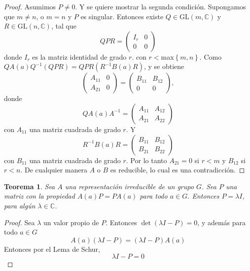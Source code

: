 \documentclass[12pt]{book}
\newtheorem{theorem}{Teorema}[section]
\theoremstyle{definition}
\newcounter{in}
\begin{document}
\begin{proof}
  Asumimos $P \neq 0$. Y se quiere mostrar la segunda
  condición. Supongamos que $m \neq n$, o $m=n$ y $P$ es
  singular. Entonces existe $Q \in \mathrm{GL}(m,\mathbb{C})$ y
  $R \in \mathrm{GL}(n,\mathbb{C})$, tal que
  \begin{equation}
    \label{eq:16}
    QPR=
    \begin{pmatrix}
      I_{r} & 0 \\ 
      0 & 0
    \end{pmatrix} 
  \end{equation}
  donde $I_{r}$ es la matriz identidad de grado $r$. con
  $r<$max$\left\{ m,n \right\}$. Como
  $QA(a)Q^{-1}(QPR) = QPR(R^{-1}B(a)R)$, y se obtiene
  \begin{equation}
    \label{eq:17}
    \begin{pmatrix}
      A_{11} & 0 \\ 
      A_{21} & 0
    \end{pmatrix}
    =
    \begin{pmatrix}
      B_{11} & B_{12} \\ 
      0 & 0
    \end{pmatrix},
  \end{equation}
  donde
  \begin{equation}
    \label{eq:18}
    QA(a)A^{-1}=
    \begin{pmatrix}
      A_{11} & A_{12} \\ 
      A_{21} & A_{22}
    \end{pmatrix} 
  \end{equation}  
  con $A_{11}$ una matriz cuadrada de grado $r$. Y
  \begin{equation}
    \label{eq:19}
    R^{-1}B(a)R=
    \begin{pmatrix}
      B_{11} & B_{12} \\ 
      B_{21} & B_{22}
    \end{pmatrix}
  \end{equation}
  con $B_{11}$ una matriz cuadrada de grado $r$. Por lo tanto
  $A_{21}=0$ si $r<m$ y $B_{12}$ si $r<n$. De cualquier manera
  $A$ o $B$ es reducible, lo cual es una
  contradicción.
\end{proof}

\begin{theorem}
  \label{t3_2}
  Sea $A$ una representación irreducible de un
  grupo $G$. Sea $P$ una matriz con la propiedad $A(a)P=PA(a)$ para todo
  $a \in G$. Entonces $P=\lambda I$, para algún
  $\lambda \in \mathbb{C}$.
\end{theorem}
\begin{proof}
  Sea $\lambda$ un valor propio de $P$. Entonces
  $\det(\lambda I - P)=0$, y además para todo $a \in G$
  \begin{equation}
    \label{eq:20}
    A(a)(\lambda I - P)=(\lambda I - P)A(a)
  \end{equation}
  Entonces por el Lema de Schur,
  \begin{equation}
    \label{eq:21}
    \lambda I-P=0
  \end{equation}
\end{proof}
\end{document}
